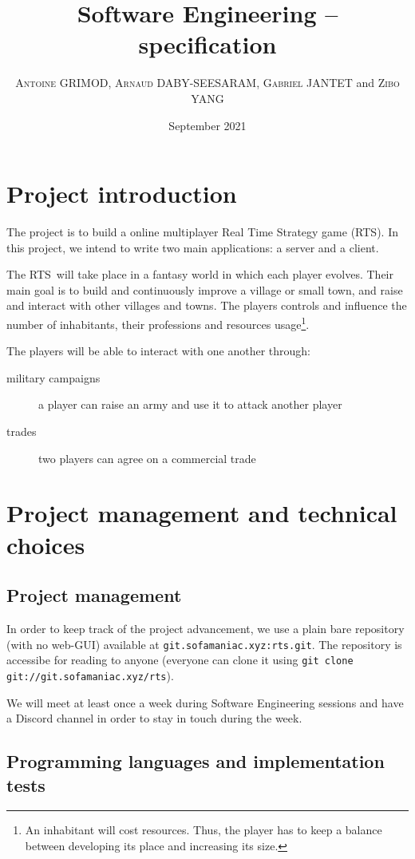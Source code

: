 \documentclass{article}
\title{Software Engineering -- specification}
\author{%
	\textsc{Antoine GRIMOD},
	\textsc{Arnaud DABY-SEESARAM},
	\textsc{Gabriel JANTET} and
	\textsc{Zibo YANG}}
\date{September 2021}
\newif\ifrts
\def\rts{\ifrts RTS\else Real Time Strategy game (RTS)\rtstrue\fi}
\begin{document}
\maketitle

\section{Project introduction}
The project is to build a online multiplayer \rts. In this project, we intend to write
two main applications: a server and a client.

The \rts~will take place in a fantasy world in which each player evolves.
Their main goal is to build and continuously improve a village or small town,
and raise and interact with other villages and towns.
The players controls and influence the number of inhabitants, their professions
and resources usage\footnote{An inhabitant will cost resources. Thus, the player
has to keep a balance between developing its place and increasing its size.}.
\medskip

The players will be able to interact with one another through:
\begin{description}
	\item[military campaigns] a player can raise an army and use it to attack
	another player
	\item[trades] two players can agree on a commercial trade
\end{description}



\section{Project management and technical choices}
\subsection{Project management}
In order to keep track of the project advancement, we use a plain bare
repository (with no web-GUI) available at \texttt{git.sofamaniac.xyz:rts.git}.
The repository is accessibe for reading to anyone (everyone can clone it
using \texttt{git clone git://git.sofamaniac.xyz/rts}).

We will meet at least once a week during Software Engineering sessions and have
a Discord channel in order to stay in touch during the week.

\subsection{Programming languages and implementation tests}
\end{document}
